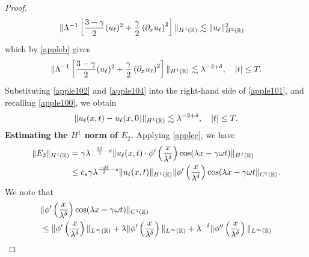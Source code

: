 \begin{proof}
\begin{equation*}
\begin{split}
\|\Lambda^{-1} \left[ \frac{3-\gamma}{2}(u_\ell)^2 +
\frac{\gamma}{2}\left( \partial_x u_\ell \right)^2 \right] \|_{H^1(\mathbb{R})}
& \lesssim \|u_\ell\|_{H^2(\mathbb{R})}^2
\end{split}
\end{equation*}
%
%
which by \cref{appleb} gives
%
%
\begin{equation}
\begin{split}
\|\Lambda^{-1} \left[ \frac{3-\gamma}{2}(u_\ell)^2 +
\frac{\gamma}{2}\left( \partial_x u_\ell \right)^2 \right] \|_{H^1(\mathbb{R})}
\lesssim \lambda^{-2 + \delta}, \quad |t| \le T.
\label{apple104}
\end{split}
\end{equation}
%
%
Substituting \eqref{apple102} and \eqref{apple104} into the right-hand side 
of
\eqref{apple101}, and recalling \eqref{apple100}, we obtain
%
%
\begin{equation}
\begin{split}
\|u_\ell(x,t) - u_\ell(x,0)\|_{H^1(\mathbb{R})} \lesssim \lambda^{-2 + \delta}, 
\quad |t| \le T.
\label{apple105}
\end{split}
\end{equation}
%
{\bf Estimating the $H^1$ norm of $\hyperref[all_errors_together]{E_2}$.} Applying  \cref{applec}, we have
\begin{equation}
	\begin{split}
		\|E_2\|_{H^1(\mathbb{R})} 
		& = \gamma \lambda^{-\frac{3 \delta}{2} -s } \|u_\ell(x,t) \cdot
		\phi'\left( \frac{x}{\lambda^\delta} \right) \cos (\lambda x - \gamma \omega t)
		\|_{H^1(\mathbb{R})}
		\\
		& \le c_s \gamma \lambda^{\frac{-3 \delta}{2} -s } \|u_\ell(x,t) \|_{H^1(\mathbb{R})}
		\|\phi'\left( \frac{x}{\lambda^\delta} \right )
		\cos(\lambda x - \gamma \omega t 
		\|_{C^1(\mathbb{R})}.
		\label{apple18}
	\end{split}
\end{equation}
We note that
\begin{equation*}
	\begin{split}
		& \|\phi'\left( \frac{x}{\lambda^\delta} \right) \cos(\lambda x - \gamma \omega t)
		\|_{C^1(\mathbb{R})}
		\\
		& \le \|\phi' \left( \frac{x}{\lambda^\delta} \right)\|_{L^\infty(\mathbb{R})} +
		\lambda \|\phi'\left( \frac{x}{\lambda^\delta} \right)\|_{L^\infty(\mathbb{R})}
		+ \lambda^{-\delta} \|\phi''\left( \frac{x}{\lambda^\delta} \right)
		\|_{L^\infty(\mathbb{R})}
	\end{split}
\end{equation*}

\end{proof}
